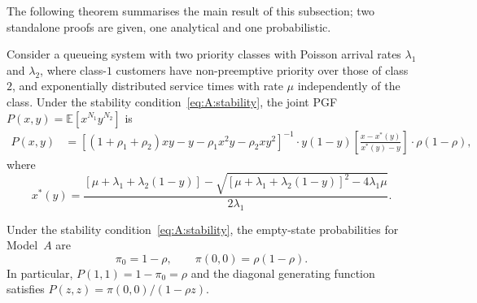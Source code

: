 The following theorem summarises the main result of this subsection; two standalone
proofs are given, one analytical and one probabilistic.
\begin{theorem}\label{thm:A:PGF}
    Consider a queueing system with two priority classes with Poisson arrival rates
    $\lambda_1$ and $\lambda_2$, where class-$1$ customers have non-preemptive priority
    over those of class~$2$, and exponentially distributed service times with rate $\mu$
    independently of the class. Under the stability condition~\eqref{eq:A:stability}, the
    joint PGF $P(x,y) = \mathbb{E}[x^{N_1}y^{N_2}]$ is
    \begin{align}
        P(x,y) &= \left[ (1+\rho_1 +\rho_2)xy - y -\rho_1x^2y - \rho_2xy^2 \right]^{-1}
                  \cdot y(1-y) \left[ \frac{x - x^*(y)}{x^*(y)-y} \right] \cdot \rho (1-\rho),
        \label{eq:A:PGF}
    \end{align}
    where
    \begin{equation}
        x^*(y) = \frac{\left[\mu + \lambda_1 + \lambda_2 (1-y)\right]
                       - \sqrt{\left[\mu + \lambda_1 + \lambda_2 (1-y)\right]^2 - 4 \lambda_1 \mu}}
                      {2 \lambda_1}.
        \label{eq:A:xstar_def}
    \end{equation}
\end{theorem}

\begin{corollary}\label{cor:A:pi0}
    Under the stability condition~\eqref{eq:A:stability}, the empty-state probabilities
    for Model~$A$ are
    \begin{equation}
        \pi_0 = 1-\rho, \qquad \pi(0,0) = \rho(1-\rho). \label{eq:A:pi0_pi00}
    \end{equation}
    In particular, $P(1,1) = 1-\pi_0 = \rho$ and the diagonal generating function
    satisfies $P(z,z)=\pi(0,0)/(1-\rho z)$.
\end{corollary}

